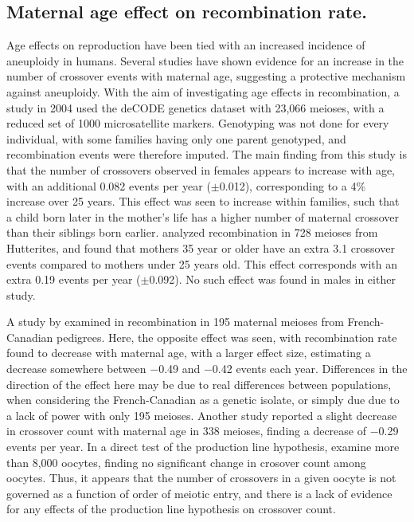 \subsection{Maternal age effect on recombination rate.}

Age effects on reproduction have been tied with an increased incidence of aneuploidy in humans\cite{Hassold2001,Hassold2007}.
Several studies have shown evidence for an increase in the number of crossover events with maternal age, suggesting a protective mechanism against aneuploidy.
With the aim of investigating age effects in recombination, a study in 2004 used the deCODE genetics dataset with 23,066 meioses, with a reduced set of 1000 microsatellite markers\cite{Kong2004}.
Genotyping was not done for every individual, with some families having only one parent genotyped, and recombination events were therefore imputed.
The main finding from this study is that the number of crossovers observed in females appears to increase with age, with an additional 0.082 events per year ($\pm$0.012), corresponding to a 4\% increase over 25 years.
This effect was seen to increase within families, such that a child born later in the mother's life has a higher number of maternal crossover than their siblings born earlier.
\citet{Coop2008} analyzed recombination in 728 meioses from Hutterites, and found that mothers 35 year or older have an extra 3.1 crossover events compared to mothers under 25 years old.
This effect corresponds with an extra 0.19 events per year ($\pm$0.092).
No such effect was found in males in either study.

A study by \citet{Hussin2011} examined in recombination in 195 maternal meioses from French-Canadian pedigrees.
Here, the opposite effect was seen, with recombination rate found to decrease with maternal age, with a larger effect size, estimating a decrease somewhere between $-$0.49 and $-$0.42 events each year.
Differences in the direction of the effect here may be due to real differences between populations, when considering the French-Canadian as a genetic isolate, or simply due due to a lack of power with only 195 meioses.
Another study reported a slight decrease in crossover count with maternal age in 338 meioses, finding a decrease of $-$0.29 events per year\cite{Bleazard2013}.
In a direct test of the production line hypothesis, \citet{Rowsey2014} examine more than 8,000 oocytes, finding no significant change in crosover count among oocytes.
Thus, it appears that the number of crossovers in a given oocyte is not governed as a function of order of meiotic entry, and there is a lack of evidence for any effects of the production line hypothesis on crossover count.

